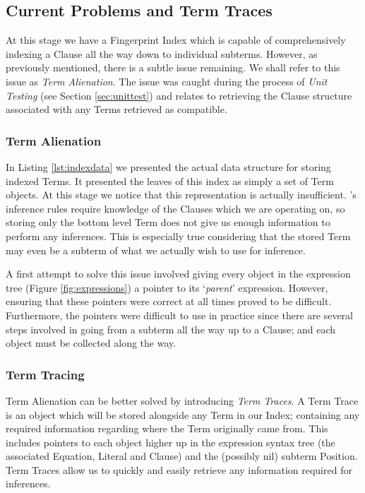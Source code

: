 \subsection{Current Problems and Term Traces}
\label{sec:problems}
At this stage we have a Fingerprint Index which is capable of comprehensively indexing a Clause
all the way down to individual subterms. However, as previously mentioned,
there is a subtle issue remaining. We shall refer to this issue as \emph{Term Alienation}.
The issue was caught during the process of \emph{Unit Testing} (see Section \ref{sec:unittest}) and relates
to retrieving the Clause structure associated with any Terms retrieved as compatible.

\subsubsection{Term Alienation}
In Listing \ref{lst:indexdata} we presented the actual data structure for storing
indexed Terms. It presented the leaves of this index as simply a set of Term objects.
At this stage we notice that this representation is actually insufficient. \Beagle's
inference rules require knowledge of the Clauses which we are operating on, so
storing only the bottom level Term does not give us enough information to perform any
inferences. This is especially true considering that the stored Term may even
be a subterm of what we actually wish to use for inference.

A first attempt to solve this issue involved giving every object in the expression
tree (Figure \ref{fig:expressions}) a pointer to its `\emph{parent}' expression.
However, ensuring that these pointers were correct at all times proved to be
difficult. Furthermore, the pointers were difficult to use in practice since there
are several steps involved in going from a subterm all the way up to a Clause; and
each object must be collected along the way.

\subsubsection{Term Tracing}

Term Alienation can be better solved by introducing \emph{Term Traces}. A Term Trace
is an object which will be stored alongside any Term in our Index; containing any
required information regarding where the Term originally came from. This includes
pointers to each object higher up in the expression syntax tree (the associated Equation, Literal
and Clause) and the (possibly nil) subterm Position. Term Traces allow us to quickly
and easily retrieve any information required for inferences.
 
